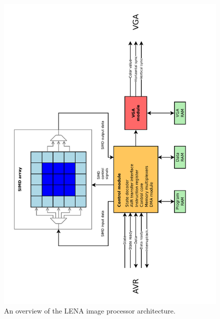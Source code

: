 \begin{figure}[h!]
\centering
\includegraphics[width=1.0\textwidth,angle=-90]{fig/fpga/architecture.pdf}
\caption{An overview of the LENA image processor architecture.}
\label{fig:fpga-architecture}
\end{figure}
